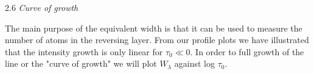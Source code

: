 \documentclass[a4paper,11.5pt,]{article}
\begin{document}
\begin{multicols}{2}
\begin{center}
2.6\textit{ Curve of growth}
\end{center}
The main purpose of the equivalent width is that it can be used to measure the number of atoms in the reversing layer. From our profile plots we have illustrated that the intensity growth is only linear for $\tau_0 \ll 0$. In order to full growth of the line or the "curve of growth" we will plot $W_\lambda$ against log $\tau_0$.



\end{multicols}
\end{document}
